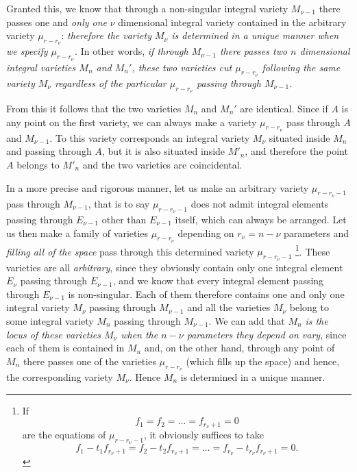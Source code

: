 \documentclass[leqno,11pt]{book}
\theoremstyle{shape1}
\theoremstyle{shapesmall}
\begin{document}
Granted this, we know that through a non-singular integral variety $M_{\nu-1}$ there passes one and \emph{only one} $\nu$ dimensional integral variety contained in the arbitrary variety $\mu_{r-r_{\nu}}$: \emph{therefore the variety $M_{\nu}$ is determined in a unique manner when we specify $\mu_{r-r_{\nu}}$.} In other words, \emph{if through $M_{\nu-1}$ there passes two $n$ dimensional integral varieties $M_{n}$ and $M_{n}'$, these two varieties cut $\mu_{r-r_{\nu}}$ following the same variety $M_{\nu}$ regardless of the particular $\mu_{r-r_{\nu}}$ passing through $M_{\nu-1}$.}

From this it follows that the two varieties $M_{n}$ and $M_{n}'$ are identical. Since if $A$ is any point on the first variety, we can always make a variety $\mu_{r-r_{\nu}}$ pass through $A$ and $M_{\nu-1}$. To this variety corresponds an integral variety $M_{\nu}$ situated inside $M_{n}$ and passing through $A$, but it is also situated inside $M'_{n}$, and therefore the point $A$ belongs to $M'_{n}$ and the two varieties are coincidental.

In a more precise and rigorous manner, let us make an arbitrary variety $\mu_{r-r_{\nu}-1}$ pass through $M_{\nu-1}$, that is to say $\mu_{r-r_{\nu}-1}$ does not admit integral elements passing through $E_{\nu-1}$ other than $E_{\nu-1}$ itself, which can always be arranged. Let us then make a family of varieties $\mu_{r-r_{\nu}}$ depending on $r_{\nu}=n-\nu$ parameters and \emph{filling all of the space} pass through this determined variety $\mu_{r-r_{\nu}-1}$ \footnote{If
\[
f_{1}=f_{2}=\dots=f_{r_{\nu}+1}=0
\]
are the equations of $\mu_{r-r_{\nu}-1}$, it obviously suffices to take
\[
f_{1}-t_{1}f_{r_{\nu}+1}=f_{2}-t_{2}f_{r_{\nu}+1}=\dots=f_{r_{\nu}}-t_{r_{\nu}}f_{r_{\nu}+1}=0.
\]
}.
These varieties are all \emph{arbitrary}, since they obviously contain only one integral element $E_{\nu}$ passing through $E_{\nu-1}$, and we know that every integral element passing through $E_{\nu-1}$ is non-singular. Each of them therefore contains one and only one integral variety $M_{\nu}$ passing through $M_{\nu-1}$ and all the varieties $M_{\nu}$ belong to some integral variety $M_{n}$ passing through $M_{\nu-1}$. We can add that $M_{n}$ \emph{is the locus of these varieties $M_{\nu}$ when the $n-\nu$ parameters they depend on vary}, since each of them is contained in $M_{n}$ and, on the other hand, through any point of $M_{n}$ there passes one of the varieties $\mu_{r-r_{\nu}}$ (which fills up the space) and hence, the corresponding variety $M_{\nu}$. Hence $M_{n}$ is determined in a unique manner.
\end{document}
